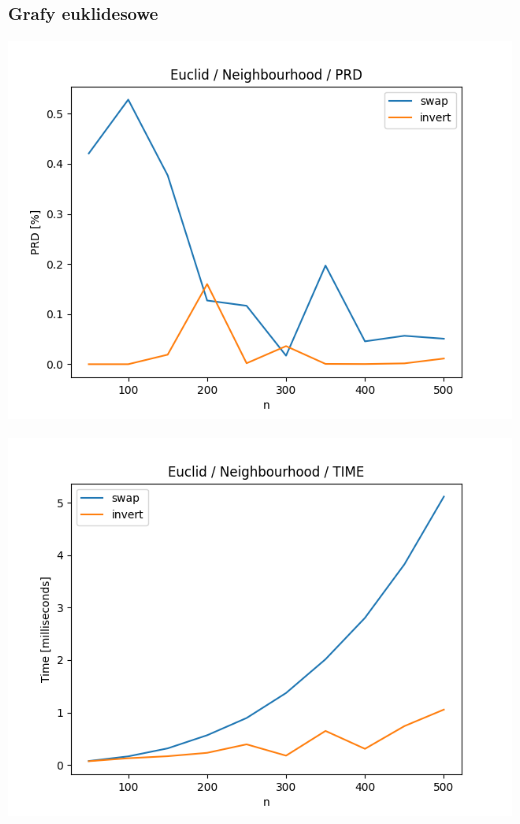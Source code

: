 \documentclass{article}
\begin{document}
\subsubsection{Grafy euklidesowe}

\begin{center}
\includegraphics[width=\textwidth, 
                   height = 0.4\textheight, 
                   keepaspectratio]
                  {plots/neighbours_euclid_prd} 
\end{center}

\begin{center}
\includegraphics[width=\textwidth, 
                   height = 0.4\textheight, 
                   keepaspectratio]
                  {plots/neighbours_euclid_time} 
\end{center}
\end{document}
